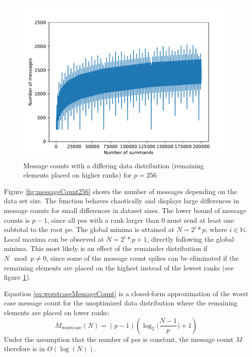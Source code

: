 \begin{figure}
\centering
\includegraphics[scale=0.7]{figures/message_count_256_remainder_at_end.pdf}
\caption{Message counts with a differing data distribution (remaining elements placed on higher ranks) for $p=256$}
\label{fig:messageCount256RemainderAtEnd}
\end{figure}

Figure \ref{fig:messageCount256} shows the number of messages depending on the data set size.
The function behaves chaotically and displays large differences in message counts for small differences in dataset sizes.
The lower bound of message counts is $p - 1$, since all \glspl{pe} with a rank larger than $0$ must send at least one subtotal to the root \gls{pe}.
The global minima is attained at $N = 2^i * p$, where $i \in \mathbb{N}$.
Local maxima can be observed at $N = 2^i * p + 1$, directly following the global minima.
This most likely is an effect of the remainder distribution if $N \mod p \neq 0$, since some of the message count spikes can be eliminated if the remaining elements are placed on the highest instead of the lowest ranks (see figure \ref{fig:messageCount256RemainderAtEnd}).

Equation \eqref{eq:worstcaseMessageCount} is a closed-form approximation of the worst case message count for the unoptimized data distribution where the remaining elements are placed on lower ranks:
\begin{equation}
\label{eq:worstcaseMessageCount}
M_{\textrm{worstcase}}(N) = (p - 1) (\log_2 \Big( \frac{N - 1}{p} \Big) + 1)
\end{equation}
Under the assumption that the number of \glspl{pe} is constant, the message count $M$ therefore is in $O(\log(N))$.